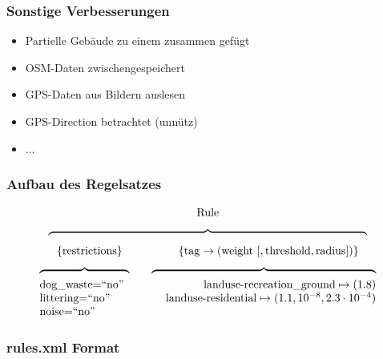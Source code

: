 \begin{frame}
  \frametitle{Sonstige Verbesserungen}
  \begin{itemize}
    \item Partielle Gebäude zu einem zusammen gefügt
    \item OSM-Daten zwischengespeichert
    \item GPS-Daten aus Bildern auslesen
    \item GPS-Direction betrachtet (unnütz)
    \item ...
  \end{itemize}
\end{frame}

\begin{frame}[fragile]
 \frametitle{Aufbau des Regelsatzes}
 \[
  \begin{array}{c}
  \text{Rule} \\[6pt]
  \overbrace{\hspace{284pt}}\\[4pt]
    \{ \text{restrictions} \}
    \hspace{50pt}
    \{ \text{tag} \to (\text{weight}~[,\text{threshold},\text{radius}]) \} \\[6pt]
    \begin{array}{l r}
      \overbrace{ \hspace{80pt} } \hspace{10pt} & \overbrace{ \hspace{200pt} }\\
      \text{dog\_waste=``no''} & \text{landuse-recreation\_ground} \mapsto (1.8) \\
      \text{littering=``no''} & \text{landuse-residential} \mapsto (1.1,10^{-8},2.3\cdot 10^{-4}) \\
      \text{noise=``no''} & 
    \end{array}
  \end{array}
 \]
\end{frame}

\begin{frame}[fragile]
  \frametitle{rules.xml Format}
  \lstset{language=XML,basicstyle=\scriptsize}
  
\end{frame}
